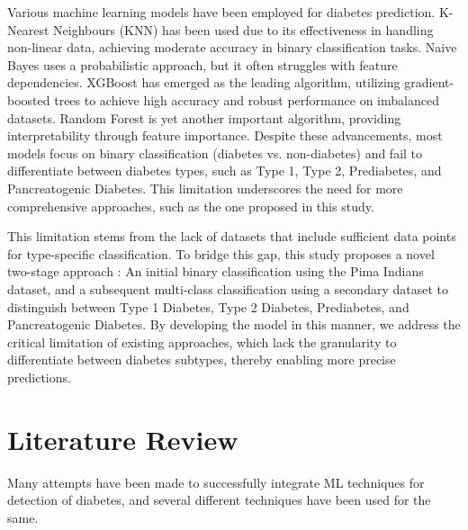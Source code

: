 \documentclass{article}
\begin{document}
\begin{multicols}{2}

Various machine learning models have been employed for diabetes prediction. 
K-Nearest Neighbours (KNN) has been used due to its effectiveness in handling non-linear data, achieving moderate accuracy in binary classification tasks. 
Naive Bayes uses a probabilistic approach, but it often struggles with feature dependencies. 
XGBoost has emerged as the leading algorithm, utilizing gradient-boosted trees to achieve high accuracy and robust performance on imbalanced datasets. 
Random Forest is yet another important algorithm, providing interpretability through feature importance.
Despite these advancements, most models focus on binary classification (diabetes vs. non-diabetes) and fail to differentiate between diabetes types, such as Type 1, Type 2, Prediabetes, and Pancreatogenic Diabetes.
This limitation underscores the need for more comprehensive approaches, such as the one proposed in this study.

This limitation stems from the lack of datasets that include sufficient data points for type-specific classification. To bridge this gap, this study proposes a novel two-stage approach :
An initial binary classification using the Pima Indians dataset, and a subsequent multi-class classification using a secondary dataset to distinguish between Type 1 Diabetes, Type 2 Diabetes, Prediabetes, and Pancreatogenic Diabetes.
By developing the model in this manner, we address the critical limitation of existing approaches, which lack the granularity to differentiate between diabetes subtypes, thereby enabling more precise predictions.

\section{Literature Review}

Many attempts have been made to successfully integrate ML techniques for detection of diabetes, and several different techniques have been used for the same.


\end{multicols}
\end{document}
